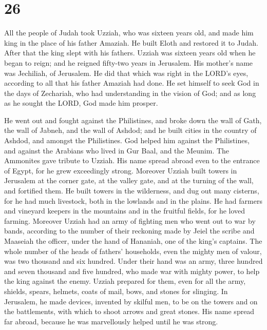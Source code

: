 \hypertarget{section-25}{%
\section{26}\label{section-25}}

 All the people of Judah took Uzziah, who was sixteen years
old, and made him king in the place of his father Amaziah. 
He built Eloth and restored it to Judah. After that the king slept with
his fathers.  Uzziah was sixteen years old when he began to
reign; and he reigned fifty-two years in Jerusalem. His mother's name
was Jechiliah, of Jerusalem.  He did that which was right in
the LORD's eyes, according to all that his father Amaziah had done.
 He set himself to seek God in the days of Zechariah, who
had understanding in the vision of God; and as long as he sought the
LORD, God made him prosper.

 He went out and fought against the Philistines, and broke
down the wall of Gath, the wall of Jabneh, and the wall of Ashdod; and
he built cities in the country of Ashdod, and amongst the Philistines.
 God helped him against the Philistines, and against the
Arabians who lived in Gur Baal, and the Meunim.  The
Ammonites gave tribute to Uzziah. His name spread abroad even to the
entrance of Egypt, for he grew exceedingly strong.  Moreover
Uzziah built towers in Jerusalem at the corner gate, at the valley gate,
and at the turning of the wall, and fortified them.  He
built towers in the wilderness, and dug out many cisterns, for he had
much livestock, both in the lowlands and in the plains. He had farmers
and vineyard keepers in the mountains and in the fruitful fields, for he
loved farming.  Moreover Uzziah had an army of fighting men
who went out to war by bands, according to the number of their reckoning
made by Jeiel the scribe and Maaseiah the officer, under the hand of
Hananiah, one of the king's captains.  The whole number of
the heads of fathers' households, even the mighty men of valour, was two
thousand and six hundred.  Under their hand was an army,
three hundred and seven thousand and five hundred, who made war with
mighty power, to help the king against the enemy.  Uzziah
prepared for them, even for all the army, shields, spears, helmets,
coats of mail, bows, and stones for slinging.  In
Jerusalem, he made devices, invented by skilful men, to be on the towers
and on the battlements, with which to shoot arrows and great stones. His
name spread far abroad, because he was marvellously helped until he was
strong.

